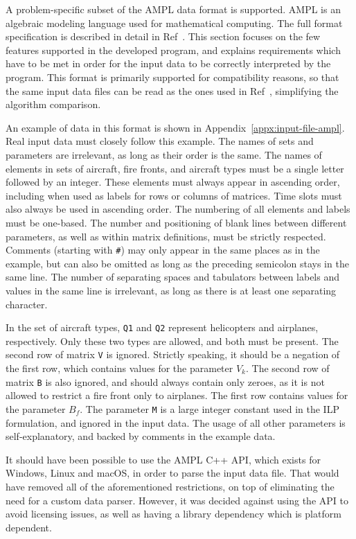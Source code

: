 A problem-specific subset of the AMPL data format is supported.
AMPL is an algebraic modeling language used for mathematical computing.
The full format specification is described in detail in Ref~\cite{Fourer/AMPL}.
This section focuses on the few features supported in the developed program, and explains requirements which have to be met in order for the input data to be correctly interpreted by the program.
This format is primarily supported for compatibility reasons, so that the same input data files can be read as the ones used in Ref~\cite{SkorinKapov/ILP}, simplifying the algorithm comparison.

An example of data in this format is shown in Appendix~\ref{appx:input-file-ampl}.
Real input data must closely follow this example.
The names of sets and parameters are irrelevant, as long as their order is the same.
The names of elements in sets of aircraft, fire fronts, and aircraft types must be a single letter followed by an integer.
These elements must always appear in ascending order, including when used as labels for rows or columns of matrices.
Time slots must also always be used in ascending order.
The numbering of all elements and labels must be one-based.
The number and positioning of blank lines between different parameters, as well as within matrix definitions, must be strictly respected. 
Comments (starting with \texttt{\#}) may only appear in the same places as in the example, but can also be omitted as long as the preceding semicolon stays in the same line.
The number of separating spaces and tabulators between labels and values in the same line is irrelevant, as long as there is at least one separating character.

In the set of aircraft types, \texttt{Q1} and \texttt{Q2} represent helicopters and airplanes, respectively.
Only these two types are allowed, and both must be present.
The second row of matrix \texttt{V} is ignored.
Strictly speaking, it should be a negation of the first row, which contains values for the parameter $V_k$.
The second row of matrix \texttt{B} is also ignored, and should always contain only zeroes, as it is not allowed to restrict a fire front only to airplanes.
The first row contains values for the parameter $B_f$.
The parameter \texttt{M} is a large integer constant used in the ILP formulation, and ignored in the input data.
The usage of all other parameters is self-explanatory, and backed by comments in the example data.

It should have been possible to use the AMPL C++ API, which exists for Windows, Linux and macOS, in order to parse the input data file.
That would have removed all of the aforementioned restrictions, on top of eliminating the need for a custom data parser.
However, it was decided against using the API to avoid licensing issues, as well as having a library dependency which is platform dependent.


